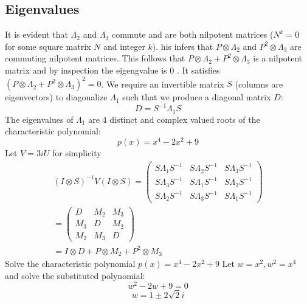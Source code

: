 \subsection{Eigenvalues}
It is evident that $\Lambda_{2}$ and $\Lambda_{3}$ commute and are both nilpotent matrices ($N^{k} = 0$ for some square matrix $N$ and integer $k$). his infers that $P \otimes \Lambda_{2}$ and $P^2 \otimes \Lambda_{3}$ are commuting nilpotent matrices. This follows that $P \otimes \Lambda_{2} + P^{2} \otimes \Lambda_{3}$ is a nilpotent matrix and by inspection the eigengvalue is $0$ . It satisfies $(P \otimes \Lambda_{2} + P^{2} \otimes \Lambda_{3})^2 = 0 $.
We require an invertible matrix $S$ (columns are eigenvectors) to diagonalize $\Lambda_{1}$ such that we produce a diagonal matrix $D$:
\begin{equation}
    D = S^{-1}\Lambda_{1}S
\end{equation}
The eigenvalues of $\Lambda_{1}$ are 4 distinct and complex valued roots of the characteristic polynomial: 
\begin{equation}
    p(x) = x^4 - 2x^2 + 9
\end{equation}
Let $V = 3iU$ for simplicity
\begin{eqnarray}
    (I \otimes S)^{-1}V (I \otimes S) = 
    \begin{pmatrix}
    S\Lambda_{1}S^{-1} & S\Lambda_{2}S^{-1} & S\Lambda_{3}S^{-1} \\
    S\Lambda_{3}S^{-1} & S\Lambda_{1}S^{-1} & S\Lambda_{2} S^{-1} \\
    S\Lambda_{2}S^{-1} & S\Lambda_{3}S^{-1} & S\Lambda_{1}S^{-1} 
    \end{pmatrix} \\
    = \begin{pmatrix}
    D & M_{2} & M_{3} \\
    M_{3} & D & M_{2} \\
    M_{2} & M_{3} & D
    \end{pmatrix} \\
    = I \otimes D + P \otimes M_{2} + P^{2} \otimes M_{3}
\end{eqnarray}
Solve the characteristic polynomial $p(x) = x^4 - 2x^2 + 9$ \newline
Let $w = x^2, w^2 = x^4$ and solve the substituted polynomial:
\begin{equation}
    w^2 - 2w+ 9 =0
\end{equation}
\begin{equation}
    w = 1 \pm 2\sqrt{2}i
\end{equation}

